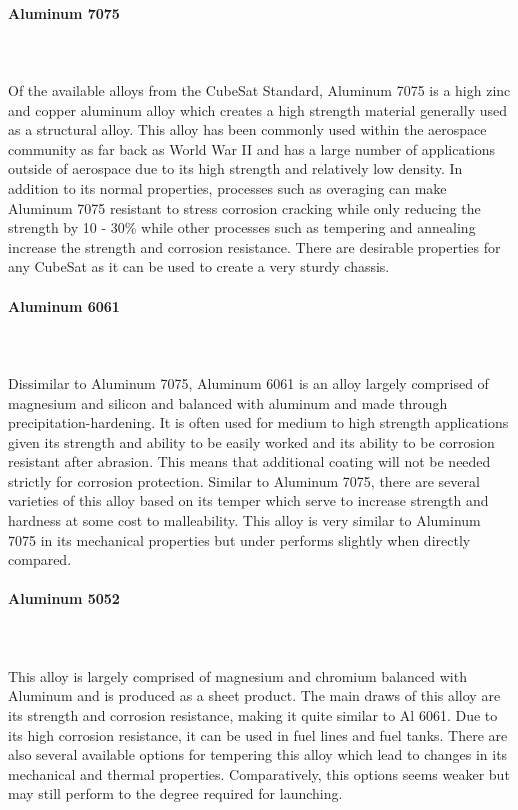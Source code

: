\paragraph{Aluminum 7075} ~\\~\\
Of the available alloys from the CubeSat Standard, Aluminum 7075 is a high zinc and copper aluminum alloy which creates a high strength material  generally used as a structural alloy. This alloy has been commonly used within the aerospace community as far back as World War II and has a large number of applications outside of aerospace due to its high strength and relatively low density. In addition to its normal properties, processes such as overaging can make Aluminum 7075 resistant to stress corrosion cracking while only reducing the strength by 10 - 30\% while other processes such as tempering and annealing increase the strength and corrosion resistance. There are desirable properties for any CubeSat as it can be used to create a very sturdy chassis. 
\paragraph{Aluminum 6061} ~\\~\\
Dissimilar to Aluminum 7075, Aluminum 6061 is an alloy largely comprised of magnesium and silicon and balanced with aluminum and made through precipitation-hardening. It is often used for medium to high strength applications given its strength and ability to be easily worked and its ability to be corrosion resistant after abrasion. This means that additional coating will not be needed strictly for corrosion protection. Similar to Aluminum 7075, there are several varieties of this alloy based on its temper which serve to increase strength and hardness at some cost to malleability. This alloy is very similar to Aluminum 7075 in its mechanical properties but under performs slightly when directly compared.
\paragraph{Aluminum 5052} ~\\~\\
This alloy is largely comprised of magnesium and chromium balanced with Aluminum and is produced as a sheet product. The main draws of this alloy are its strength and corrosion resistance, making it quite similar to Al 6061. Due to its high corrosion resistance, it can be used in fuel lines and fuel tanks. There are also several available options for tempering this alloy which lead to changes in its mechanical and thermal properties. Comparatively, this options seems weaker but may still perform to the degree required for launching.
